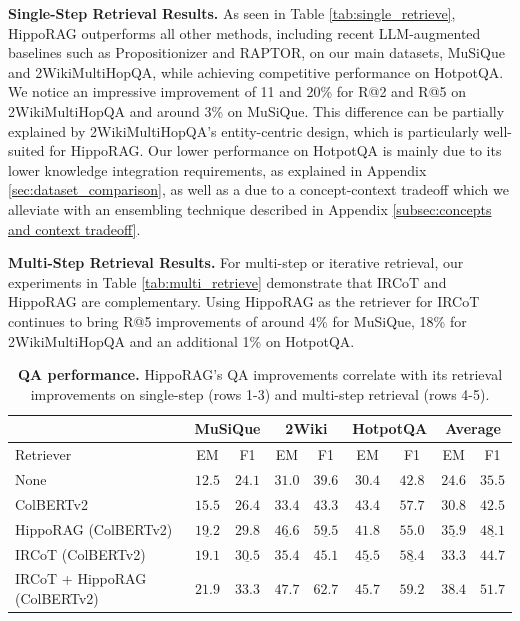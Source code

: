 \documentclass{article}
\begin{document}
\noindent \textbf{Single-Step Retrieval Results.} As seen in Table \ref{tab:single_retrieve}, HippoRAG outperforms all other methods, including recent LLM-augmented baselines such as Propositionizer and RAPTOR, on our main datasets, MuSiQue and 2WikiMultiHopQA, while achieving competitive performance on HotpotQA.
We notice an impressive improvement of \num{11} and \num{20}\% for R@2 and R@5 on 2WikiMultiHopQA and around \num{3}\% on MuSiQue. 
This difference can be partially explained by 2WikiMultiHopQA's entity-centric design, which is particularly well-suited for HippoRAG.
Our lower performance on HotpotQA is mainly due to its lower knowledge integration requirements, as explained in Appendix \ref{sec:dataset_comparison}, as well as a due to a concept-context tradeoff which we alleviate with an ensembling technique described in Appendix \ref{subsec:concepts and context tradeoff}.

\noindent \textbf{Multi-Step Retrieval Results.} For multi-step or iterative retrieval, our experiments in Table \ref{tab:multi_retrieve} demonstrate that IRCoT \cite{ircot} and HippoRAG are complementary. Using HippoRAG as the retriever for IRCoT continues to bring R@5 improvements of around \num{4}\% for MuSiQue, \num{18}\% for 2WikiMultiHopQA and an additional \num{1}\% on HotpotQA.


\begin{table}[t]
\small
\centering
\caption{\textbf{QA performance.} HippoRAG's QA improvements correlate with its retrieval improvements on single-step (rows 1-3) and multi-step retrieval (rows 4-5).}
\label{tab:qa results}
\begin{tabular}{lcccccc|cc}
\toprule
 & \multicolumn{2}{c}{\textbf{MuSiQue}} & \multicolumn{2}{c}{\textbf{2Wiki}} & \multicolumn{2}{c}{\textbf{HotpotQA}} & \multicolumn{2}{c}{\textbf{Average}}  \\ \midrule
Retriever & EM & F1 & EM & F1 & EM & F1 & EM & F1\\ \midrule
None & $12.5$ & $24.1$ & $31.0$ & $39.6$ & $30.4$ & $42.8$ & $24.6$ & $35.5$ \\ 
ColBERTv2 & $15.5$ & $26.4$ & $33.4$ & $43.3$ & $43.4$ & $57.7$ & $30.8$ & $42.5$ \\  
HippoRAG (ColBERTv2) & $\underline{19.2}$ & $29.8$ & $\underline{46.6}$ & $\underline{59.5}$ & $41.8$ & $55.0$ & $\underline{35.9}$ & $\underline{48.1}$ \\ \midrule 
IRCoT (ColBERTv2) & $19.1$ & $\underline{30.5}$ & $35.4$ & $45.1$ & $\underline{45.5}$ & $\underline{58.4}$ & $33.3$ & $44.7$ \\  
IRCoT + HippoRAG (ColBERTv2) & $\mathbf{21.9}$ & $\mathbf{33.3}$ & $\mathbf{47.7}$ & $\mathbf{62.7}$ & $\mathbf{45.7}$ & $\mathbf{59.2}$ & $\mathbf{38.4}$ & $\mathbf{51.7}$ \\
 \bottomrule
\end{tabular}
\end{table}
\end{document}
